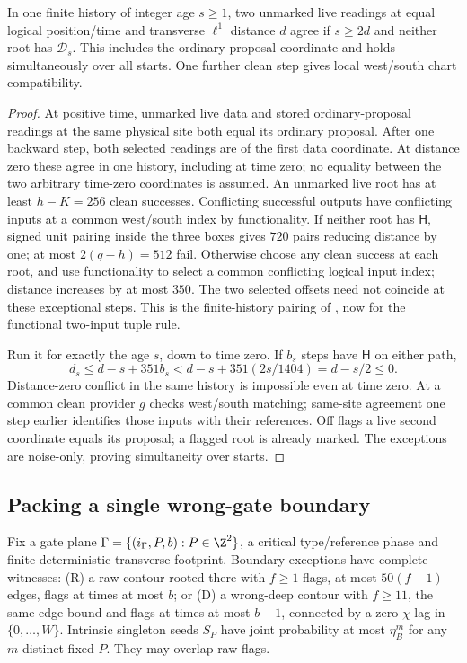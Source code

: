 \begin{lemma}\label{lem:three-coherence}
In one finite history of integer age $s\ge1$, two unmarked live readings at equal logical position/time and transverse $\ell^1$ distance $d$ agree if $s\ge2d$ and neither root has $\mathcal D_s$. This includes the ordinary-proposal coordinate and holds simultaneously over all starts. One further clean step gives local west/south chart compatibility.
\end{lemma}
\begin{proof}
At positive time, unmarked live data and stored ordinary-proposal readings at the same physical site both equal its ordinary proposal. After one backward step, both selected readings are of the first data coordinate. At distance zero these agree in one history, including at time zero; no equality between the two arbitrary time-zero coordinates is assumed. An unmarked live root has at least $h-K=256$ clean successes. Conflicting successful outputs have conflicting inputs at a common west/south index by functionality. If neither root has $\mathsf H$, signed unit pairing inside the three boxes gives $720$ pairs reducing distance by one; at most $2(q-h)=512$ fail. Otherwise choose any clean success at each root, and use functionality to select a common conflicting logical input index; distance increases by at most $350$. The two selected offsets need not coincide at these exceptional steps. This is the finite-history pairing of \cite[Theorem~12.12]{DMforgetLower}, now for the functional two-input tuple rule.

Run it for exactly the age $s$, down to time zero. If $b_s$ steps have $\mathsf H$ on either path,
\[
 d_s\le d-s+351b_s<d-s+351(2s/1404)=d-s/2\le0.
\]
Distance-zero conflict in the same history is impossible even at time zero. At a common clean provider $g$ checks west/south matching; same-site agreement one step earlier identifies those inputs with their references. Off flags a live second coordinate equals its proposal; a flagged root is already marked. The exceptions are noise-only, proving simultaneity over starts.
\end{proof}

\subsection{Packing a single wrong-gate boundary}

Fix a gate plane $\Gamma=\{(i_\Gamma,P,b):P\in\Z^2\}$, a critical type/reference phase and finite deterministic transverse footprint. Boundary exceptions have complete witnesses: (R) a raw contour rooted there with $f\ge1$ flags, at most $50(f-1)$ edges, flags at times at most $b$; or (D) a wrong-deep contour with $f\ge11$, the same edge bound and flags at times at most $b-1$, connected by a zero-$\chi$ lag in $\{0,\ldots,W\}$. Intrinsic singleton seeds $S_P$ have joint probability at most $\eta_B^m$ for any $m$ distinct fixed $P$. They may overlap raw flags.

